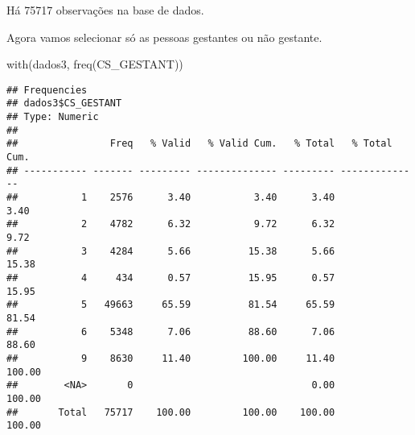 \documentclass[
]{article}
\newenvironment{Shaded}{\begin{snugshade}}{\end{snugshade}}
\newcommand{\FunctionTok}[1]{\textcolor[rgb]{0.00,0.00,0.00}{#1}}
\newcommand{\NormalTok}[1]{#1}
\begin{document}
Há 75717 observações na base de dados.

Agora vamos selecionar só as pessoas gestantes ou não gestante.

\begin{Shaded}
\begin{Highlighting}[]
\FunctionTok{with}\NormalTok{(dados3, }\FunctionTok{freq}\NormalTok{(CS\_GESTANT))}
\end{Highlighting}
\end{Shaded}

\begin{verbatim}
## Frequencies  
## dados3$CS_GESTANT  
## Type: Numeric  
## 
##                Freq   % Valid   % Valid Cum.   % Total   % Total Cum.
## ----------- ------- --------- -------------- --------- --------------
##           1    2576      3.40           3.40      3.40           3.40
##           2    4782      6.32           9.72      6.32           9.72
##           3    4284      5.66          15.38      5.66          15.38
##           4     434      0.57          15.95      0.57          15.95
##           5   49663     65.59          81.54     65.59          81.54
##           6    5348      7.06          88.60      7.06          88.60
##           9    8630     11.40         100.00     11.40         100.00
##        <NA>       0                               0.00         100.00
##       Total   75717    100.00         100.00    100.00         100.00
\end{verbatim}
\end{document}
